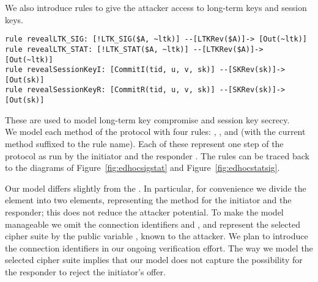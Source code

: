 We also introduce rules to give the attacker access to
long-term keys and session keys.
%
\begin{lstlisting}
rule revealLTK_SIG: [!LTK_SIG($A, ~ltk)] --[LTKRev($A)]-> [Out(~ltk)]
rule revealLTK_STAT: [!LTK_STAT($A, ~ltk)] --[LTKRev($A)]-> [Out(~ltk)]
rule revealSessionKeyI: [CommitI(tid, u, v, sk)] --[SKRev(sk)]-> [Out(sk)]
rule revealSessionKeyR: [CommitR(tid, u, v, sk)] --[SKRev(sk)]-> [Out(sk)]
\end{lstlisting}
%
These are used to model long-term key compromise and session key secrecy.
\\

We model each method of the protocol with four rules: , , 
and  (with the current method suffixed to the rule name).
%
Each of these represent one step of the protocol as run by the initiator 
and the responder .
%
The rules can be traced back to the diagrams of
Figure~\ref{fig:edhocsigstat} and Figure~\ref{fig:edhocstatsig}.
%

Our model differs slightly from the \mSpec{}.
%
In particular, for convenience we divide the \mMethod{} element into two
elements, representing the method for the initiator and the responder; this
does not reduce the attacker potential.
%
To make the model manageable we omit the connection identifiers \mCi{} and
\mCr{}, and represent the selected cipher suite by the public variable
, known to the attacker.
%
We plan to introduce the connection identifiers in our ongoing verification
effort.
%
The way we model the selected cipher suite implies that our model does not
capture the possibility for the responder to reject the initiator's offer. 
%

